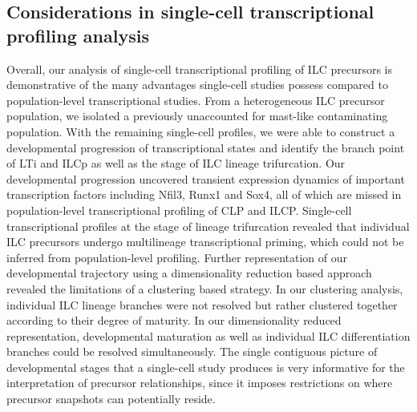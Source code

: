 \subsection{Considerations in single-cell transcriptional profiling analysis}

Overall, our analysis of single-cell transcriptional profiling of ILC precursors is demonstrative of the many advantages single-cell studies possess compared to population-level transcriptional studies. From a heterogeneous ILC precursor population, we isolated a previously unaccounted for mast-like contaminating population. With the remaining single-cell profiles, we were able to construct a developmental progression of transcriptional states and identify the branch point of LTi and ILCp as well as the stage of ILC lineage trifurcation. Our developmental progression uncovered transient expression dynamics of important transcription factors including Nfil3, Runx1 and Sox4, all of which are missed in population-level transcriptional profiling of CLP and ILCP. Single-cell transcriptional profiles at the stage of lineage trifurcation revealed that individual ILC precursors undergo multilineage transcriptional priming, which could not be inferred from population-level profiling. Further representation of our developmental trajectory using a dimensionality reduction based approach revealed the limitations of a clustering based strategy. In our clustering analysis, individual ILC lineage branches were not resolved but rather clustered together according to their degree of maturity. In our dimensionality reduced representation, developmental maturation as well as individual ILC differentiation branches could be resolved simultaneously. The single contiguous picture of developmental stages that a single-cell study produces is very informative for the interpretation of precursor relationships, since it imposes restrictions on where precursor snapshots can potentially reside. 


